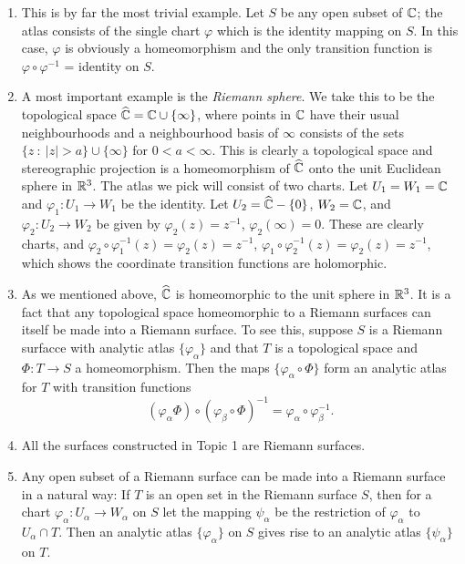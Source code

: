\documentclass[a4paper,11pt]{article}
\begin{document}
\begin{exmp}
  \begin{enumerate}
  \item This is by far the most trivial example.  Let $S$ be any open
    subset of ${\mathbb C}$; the atlas consists of the single chart $\varphi$
    which is the identity mapping on $S$.  In this case, $\varphi$ is
    obviously a homeomorphism and the only transition function is
    $\varphi \circ \varphi^{-1}$ = identity on $S$.

  \item A most important example is the \emph{Riemann sphere}.  We
    take this to be the topological space $\widehat{{\mathbb C}} = {\mathbb C} \cup
    \{\infty\}$, where points in ${\mathbb C}$ have their usual
    neighbourhoods and a neighbourhood basis of $\infty$ consists of
    the sets $\{z ~:~ |z| > a\} \cup \{\infty\}$ for $0 < a <
    \infty$.  This is clearly a topological space and stereographic
    projection is a homeomorphism of $\widehat{{\mathbb C}}$ onto the unit
    Euclidean sphere in ${\mathbb R}^3$.  The atlas we pick will consist of
    two charts.  Let $U_1 = W_1 = {\mathbb C}$ and $\varphi_1 : U_1 \to W_1$
    be the identity.  Let $U_2 = \widehat{{\mathbb C}} - \{0\}$, $W_2 = {\mathbb C}$,
    and $\varphi_2 : U_2 \to W_2$ be given by $\varphi_2(z) = z^{-1}$,
    $\varphi_2(\infty) = 0$.  These are clearly charts, and $\varphi_2
    \circ \varphi_1^{-1}(z) = \varphi_2(z) = z^{-1}$, $\varphi_1
    \circ \varphi_2^{-1}(z) = \varphi_2(z) = z^{-1}$, which shows the
    coordinate transition functions are holomorphic.

  \item As we mentioned above, $\widehat{{\mathbb C}}$ is homeomorphic to the
    unit sphere in ${\mathbb R}^3$.  It is a fact that any topological space
    homeomorphic to a Riemann surfaces can itself be made into a
    Riemann surface.  To see this, suppose $S$ is a Riemann surfacce
    with analytic atlas $\{\varphi_\alpha\}$ and that $T$ is a
    topological space and $\Phi : T \to S$ a homeomorphism.  Then the
    maps $\{\varphi_\alpha \circ \Phi\}$ form an analytic atlas for
    $T$ with transition functions
    $$
    (\varphi_\alpha \Phi) \circ (\varphi_\beta \circ \Phi)^{-1}
    = \varphi_\alpha \circ \varphi_\beta^{-1}.
    $$

  \item All the surfaces constructed in Topic 1 are Riemann
    surfaces.

  \item Any open subset of a Riemann surface can be made into a
    Riemann surface in a natural way:  If $T$ is an open set in the
    Riemann surface $S$, then for a chart $\varphi_\alpha : U_\alpha
    \to W_\alpha$ on $S$ let the mapping $\psi_\alpha$ be the
    restriction of $\varphi_\alpha$ to $U_\alpha \cap T$.  Then an
    analytic atlas $\{\varphi_\alpha\}$ on $S$ gives rise to an
    analytic atlas $\{\psi_\alpha\}$ on $T$.


\end{enumerate}
\end{exmp}
\end{document}
